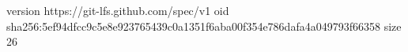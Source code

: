 version https://git-lfs.github.com/spec/v1
oid sha256:5ef94dfcc9c5e8e923765439c0a1351f6aba00f354e786dafa4a049793f66358
size 26

